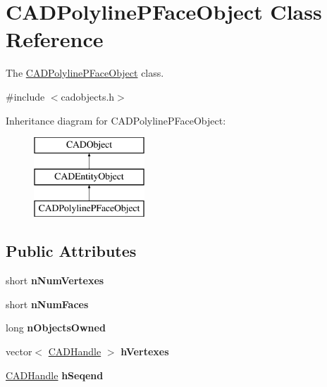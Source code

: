 \hypertarget{class_c_a_d_polyline_p_face_object}{}\section{C\+A\+D\+Polyline\+P\+Face\+Object Class Reference}
\label{class_c_a_d_polyline_p_face_object}


The \hyperlink{class_c_a_d_polyline_p_face_object}{C\+A\+D\+Polyline\+P\+Face\+Object} class.  




{\ttfamily \#include $<$cadobjects.\+h$>$}

Inheritance diagram for C\+A\+D\+Polyline\+P\+Face\+Object\+:\begin{figure}[H]
\begin{center}
\leavevmode
\includegraphics[height=3.000000cm]{class_c_a_d_polyline_p_face_object}
\end{center}
\end{figure}
\subsection*{Public Attributes}
\begin{DoxyCompactItemize}
\item 
short {\bfseries n\+Num\+Vertexes}\hypertarget{class_c_a_d_polyline_p_face_object_af883afc7cb25d620d73cea10546f999b}{}\label{class_c_a_d_polyline_p_face_object_af883afc7cb25d620d73cea10546f999b}

\item 
short {\bfseries n\+Num\+Faces}\hypertarget{class_c_a_d_polyline_p_face_object_aab179cebb085c9ff16b34ea09d1c7d5a}{}\label{class_c_a_d_polyline_p_face_object_aab179cebb085c9ff16b34ea09d1c7d5a}

\item 
long {\bfseries n\+Objects\+Owned}\hypertarget{class_c_a_d_polyline_p_face_object_a5e49d4ac3618f7d463153a05aff78918}{}\label{class_c_a_d_polyline_p_face_object_a5e49d4ac3618f7d463153a05aff78918}

\item 
vector$<$ \hyperlink{class_c_a_d_handle}{C\+A\+D\+Handle} $>$ {\bfseries h\+Vertexes}\hypertarget{class_c_a_d_polyline_p_face_object_a2bd2a8b41d63afd8b36c9f5fe235c873}{}\label{class_c_a_d_polyline_p_face_object_a2bd2a8b41d63afd8b36c9f5fe235c873}

\item 
\hyperlink{class_c_a_d_handle}{C\+A\+D\+Handle} {\bfseries h\+Seqend}\hypertarget{class_c_a_d_polyline_p_face_object_a4f0f9fb0326ca788a9b7b4afb9a8cd2b}{}\label{class_c_a_d_polyline_p_face_object_a4f0f9fb0326ca788a9b7b4afb9a8cd2b}

\end{DoxyCompactItemize}
